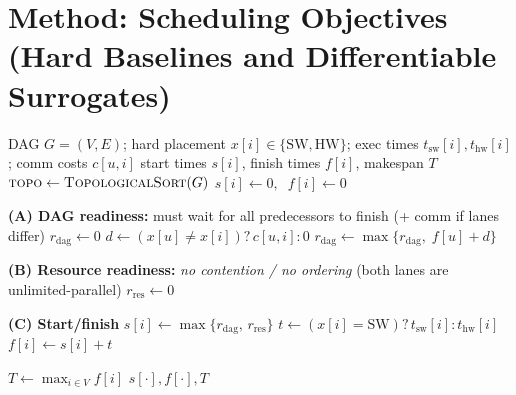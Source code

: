 \section{Method: Scheduling Objectives (Hard Baselines and Differentiable Surrogates)}
\label{sec:method}


%

\begin{algorithm}[!htbp]
\caption{HardSchedule--NoOrder (Non-differentiable baseline for Diff-GNN w/o ordering)}
\label{alg:hard_no_order_clean}
\scriptsize
\begin{algorithmic}[1]
\Require DAG $G=(V,E)$; hard placement $x[i]\in\{\mathrm{SW},\mathrm{HW}\}$; exec times $t_{\mathrm{sw}}[i],t_{\mathrm{hw}}[i]$; comm costs $c[u,i]$
\Ensure start times $s[i]$, finish times $f[i]$, makespan $T$
\State $\textsc{topo}\gets\textsc{TopologicalSort}(G)$
 \State $s[i]\gets 0,\;\; f[i]\gets 0$ \EndFor

    \Statex \textbf{(A) DAG readiness:} must wait for all predecessors to finish (+ comm if lanes differ)
    \State $r_{\mathrm{dag}}\gets 0$
        \State $d\gets (x[u]\neq x[i])?\,c[u,i]:0$
        \State $r_{\mathrm{dag}}\gets \max\{r_{\mathrm{dag}},\; f[u]+d\}$
    \EndFor

    \Statex \textbf{(B) Resource readiness:} \emph{no contention / no ordering} (both lanes are unlimited-parallel)
    \State $r_{\mathrm{res}}\gets 0$

    \Statex \textbf{(C) Start/finish}
    \State $s[i]\gets \max\{r_{\mathrm{dag}},\, r_{\mathrm{res}}\}$
    \State $t\gets (x[i]=\mathrm{SW})?\,t_{\mathrm{sw}}[i]:t_{\mathrm{hw}}[i]$
    \State $f[i]\gets s[i]+t$
\EndFor

\State $T\gets \max_{i\in V} f[i]$
\State \Return $s[\cdot], f[\cdot], T$
\end{algorithmic}
\end{algorithm}

